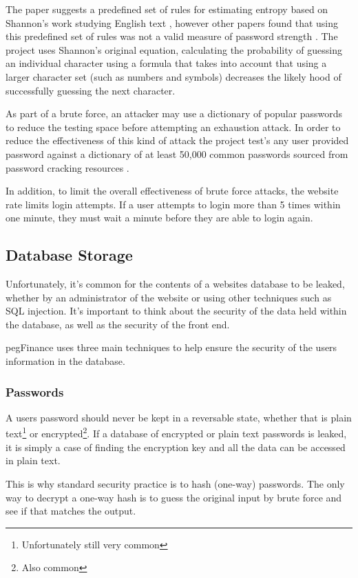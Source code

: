 The paper suggests a predefined set of rules for estimating entropy based on Shannon's work studying English text \cite{burr2013electronic}, however other papers found that using this predefined set of rules was not a valid measure of password strength \cite{weir2010shannon}.
% 
The project uses Shannon's original equation, calculating the probability of guessing an individual character using a formula that takes into account that using a larger character set (such as numbers and symbols) decreases the likely hood of successfully guessing the next character.

As part of a brute force, an attacker may use a dictionary of popular passwords to reduce the testing space before attempting an exhaustion attack. In order to reduce the effectiveness of this kind of attack the project test's any user provided password against a dictionary of at least 50,000 common passwords sourced from password cracking resources \cite{burr2013electronic}.

In addition, to limit the overall effectiveness of brute force attacks, the website rate limits login attempts. If a user attempts to login more than 5 times within one minute, they must wait a minute before they are able to login again.

\subsection{Database Storage}
Unfortunately, it's common for the contents of a websites database to be leaked, whether by an administrator of the website or using other techniques such as SQL injection. It's important to think about the security of the data held within the database, as well as the security of the front end.

pegFinance uses three main techniques to help ensure the security of the users information in the database.

\subsubsection{Passwords}
A users password should never be kept in a reversable state, whether that is plain text\footnote{Unfortunately still very common} or encrypted\footnote{Also common}. If a database of encrypted or plain text passwords is leaked, it is simply a case of finding the encryption key and all the data can be accessed in plain text.

This is why standard security practice is to hash (one-way) passwords. The only way to decrypt a one-way hash is to guess the original input by brute force and see if that matches the output.

